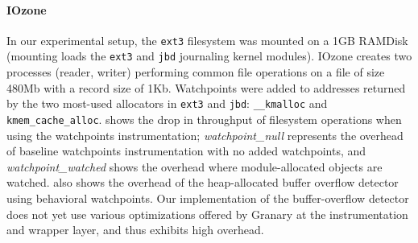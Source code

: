 \documentclass[letterpaper,twocolumn,10pt]{article}
\begin{document}












\paragraph*{IOzone} In our experimental setup, the \texttt{ext3} filesystem was mounted on a 1GB RAMDisk (mounting loads the \texttt{ext3} and \texttt{jbd} journaling kernel modules). IOzone creates two processes (reader, writer) performing common file operations on a file of size 480Mb with a record size of 1Kb. Watchpoints were added to addresses returned by the two most-used allocators in \texttt{ext3} and \texttt{jbd}: \texttt{\_\_kmalloc} and \texttt{kmem\_cache\_alloc}.  shows the drop in throughput of filesystem operations when using the watchpoints instrumentation; \emph{watchpoint\_null} represents the overhead of baseline watchpoints instrumentation with no added watchpoints, and \emph{watchpoint\_watched} shows the overhead where module-allocated objects are watched.  also shows the overhead of the heap-allocated buffer overflow detector using behavioral watchpoints. Our implementation of the buffer-overflow detector does not yet use various optimizations offered by Granary at the instrumentation and wrapper layer, and thus exhibits high overhead.
\end{document}
